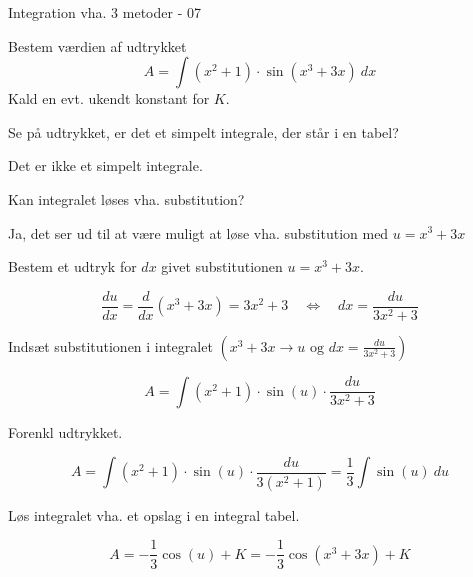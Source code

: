 \documentclass{article}
\begin{document}
\begin{exercise}{Integration vha. 3 metoder - 07}
	
	Bestem værdien af udtrykket
	\[
	A = \int (x^2+1) \cdot \sin(x^3+3x) \ dx
	\]
	Kald en evt. ukendt konstant for $K$.
	
	
	\hint
	Se på udtrykket, er det et simpelt integrale, der står i en tabel?
	
	\hint
	Det er ikke et simpelt integrale.
	
	\hint
	Kan integralet løses vha. substitution?
	
	\hint
	Ja, det ser ud til at være muligt at løse vha. substitution med $u=x^3+3x$
	
	\hint
	Bestem et udtryk for $dx$ givet substitutionen $u=x^3+3x$.
	
	\hint
	\[
	\frac{du}{dx} = \frac{d}{dx} \left(x^3+3x \right) = 3x^2 +3 \quad \Leftrightarrow \quad dx = \frac{du}{3x^2+3}
	\]
	
	\hint
	Indsæt substitutionen i integralet $\left(x^3+3x \rightarrow u \textrm{ og } dx = \frac{du}{3x^2+3} \right)$
	
	\hint
	\[
	A =  \int (x^2+1) \cdot \sin(u) \cdot \frac{du}{3x^2+3}
	\]
	
	\hint
	Forenkl udtrykket.
	
	\hint
	\[
	A=  \int (x^2+1) \cdot \sin(u) \cdot \frac{du}{3(x^2+1)}  = \frac{1}{3} \int \sin(u) \ du
	\]
	
	\hint
	Løs integralet vha. et opslag i en integral tabel.
	
	\hint
	\[
	A = -\frac{1}{3} \cos(u) + K =  -\frac{1}{3} \cos(x^3+3x) + K
	\]
	
	
\end{exercise}

\newpage
\end{document}

